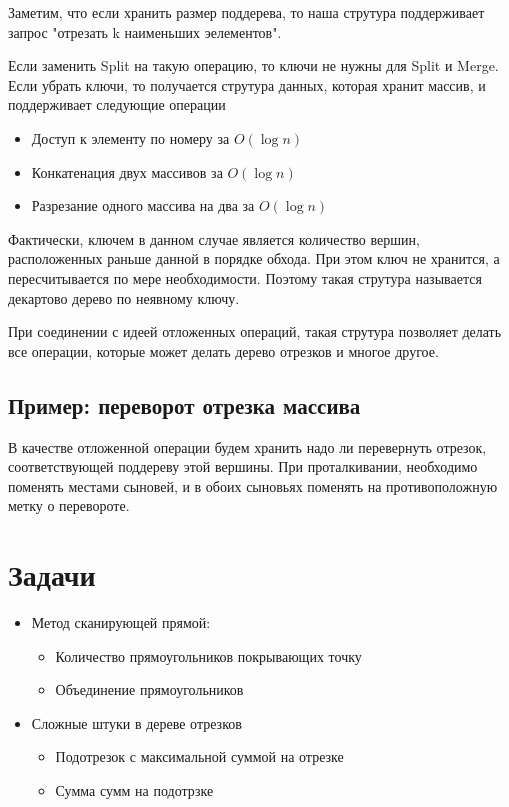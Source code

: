 \documentclass[12pt,a4paper]{article}
\theoremstyle{plain}
\begin{document}
Заметим, что если хранить размер поддерева, то наша струтура поддерживает запрос "отрезать k наименьших эелементов".

Если заменить Split на такую операцию, то ключи не нужны для Split и Merge. 
Если убрать ключи, то получается струтура данных, которая хранит массив, и поддерживает следующие операции

\begin{itemize}
\item Доступ к элементу по номеру за $O(\log{n})$
\item Конкатенация двух массивов за $O(\log{n})$
\item Разрезание одного массива на два за $O(\log{n})$
\end{itemize}

Фактически, ключем в данном случае является количество вершин, расположенных раньше данной в порядке обхода. При
этом ключ не хранится, а пересчитывается по мере необходимости. Поэтому такая струтура называется декартово дерево по неявному ключу.

При соединении с идеей отложенных операций, такая струтура позволяет делать все операции, которые может делать дерево отрезков и многое другое.

\subsection{Пример: переворот отрезка массива}

В качестве отложенной операции будем хранить надо ли перевернуть отрезок, соответствующей поддереву этой вершины.
При проталкивании, необходимо поменять местами сыновей, и в обоих сыновьях поменять на противоположную метку о перевороте.


\section{Задачи}

\begin{itemize}
\item Метод сканирующей прямой:
\begin{itemize}
\item Количество прямоугольников покрывающих точку
\item Объединение прямоугольников
\end{itemize}
\item Сложные штуки в дереве отрезков
\begin{itemize}
\item Подотрезок с максимальной суммой на отрезке
\item Сумма сумм на подотрзке
\end{itemize}
\end{itemize}
\end{document}
